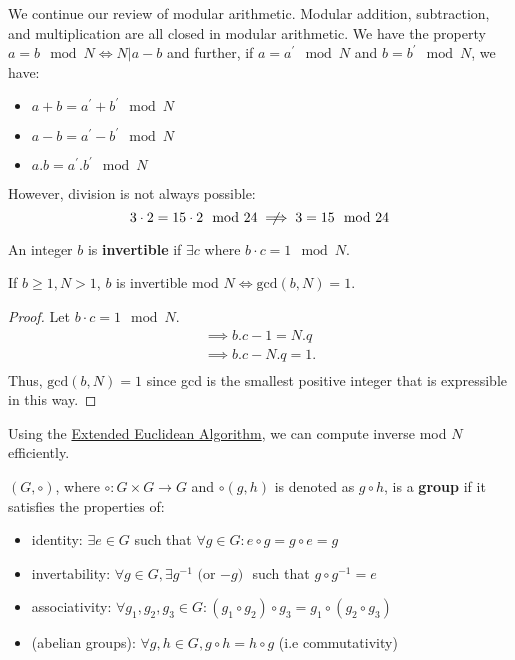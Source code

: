 
We continue our review of modular arithmetic. Modular addition, subtraction,
and multiplication are all closed in modular arithmetic. We have the property
\(a = b \mod N \iff N | a - b\) and further, if \(a = a^{\prime} \mod N\) and
\(b = b^{\prime} \mod N\), we have:   
\begin{itemize}
	\item \(a + b = a^{\prime} + b^{\prime} \mod N\) 
	\item \(a - b = a^{\prime} - b^{\prime} \mod N\) 
	\item \(a . b = a^{\prime} . b^{\prime} \mod N\) 
\end{itemize}

However, division is not always possible:
\[
	3 \cdot 2 = 15 \cdot 2 \mod 24 \centernot\implies 3 = 15 \mod 24
\]

\begin{definition}[Invertability]
	An integer \(b\) is \textbf{invertible} if \(\exists c \) where
	\(b \cdot c = 1 \mod N\).
\end{definition}

\begin{lemma}
	If \(b \geq 1, N > 1\), \(b\) is invertible mod \(N \iff \text{gcd}(b, N) = 1\).    
\end{lemma}

\begin{proof}
	Let \(b \cdot c = 1 \mod N\).
	\begin{align*}
		\implies b . c - 1 = N . q \\
		\implies b . c - N . q = 1 . \\
	\end{align*}
	Thus, \(\text{gcd}(b, N) = 1\) since gcd is the smallest positive integer                          
	that is expressible in this way.
\end{proof}

Using the \hyperref[eea]{Extended Euclidean Algorithm}, we can compute inverse mod \(N\)
efficiently.

\begin{definition}[Group]
	\((G, \circ)\), where \(\circ : G \times G \to G\) and \(\circ(g, h)\) is
	denoted as \(g \circ h\), is a \textbf{group} if it satisfies the properties of:
	\begin{itemize}
		\item identity: \(\exists e \in G\) such that \(\forall g \in G \colon e \circ g = g \circ e = g\)  
		\item invertability: \(\forall g \in G, \exists g^{-1} \text{ (or $-g$) }\) such that \(g \circ g^{-1} = e\)  
		\item associativity: \(\forall g_1, g_2, g_3 \in G \colon (g_1 \circ g_2) \circ g_3 = g_1 \circ (g_2 \circ g_3) \) 
		\item (abelian groups): \(\forall g, h \in G, g \circ h = h \circ g\) (i.e commutativity) 
	\end{itemize}   
\end{definition}

